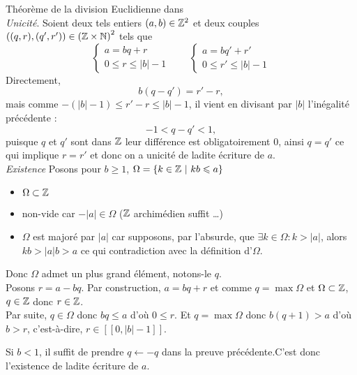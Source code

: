 \documentclass{article}
\begin{document}
  {Théorème de la division Euclidienne dans \Z}
  \hfill\\
  \textit{Unicité}. \;
  Soient deux tels entiers $(a,b) \in \mathbb Z^2$ et deux couples $((q,r),(q',r')) \in \left(\mathbb Z \times \mathbb N\right)^2$ tels que
  \begin{equation*}
    \left\{ \begin{matrix}
      a = b q + r \\
      0 \leqslant r \leqslant |b| - 1
    \end{matrix} \right.
    \qquad
    \left\{ \begin{matrix}
      a = b q' + r' \\
      0 \leqslant r' \leqslant |b| - 1
    \end{matrix} \right.
  \end{equation*}
  Directement,
  \[
    b(q-q') = r'-r,
  \]
  mais comme $-(|b|-1) \leqslant r' - r \leqslant |b| -1$, il vient en divisant par $|b|$ l'inégalité précédente :
  \[
    -1 < q - q' < 1,
  \]
  puisque $q$ et $q'$ sont dans $\mathbb Z$ leur différence est obligatoirement $0$, ainsi $q = q'$ ce qui implique $ r= r'$ et donc on a unicité de ladite écriture de $a$.
  \newline
  \\
  \textit{Existence} \; Posons pour $b \geqslant 1$, $\Omega = \{ k\in \mathbb Z  \ | \ kb \leqslant a \}$
  \begin{itemize}
    \item $\Omega \subset \mathbb Z$
    \item non-vide car $-|a| \in \Omega$ ($\mathbb Z$ archimédien suffit \ldots)
    \item $\Omega$ est majoré par $|a|$ car supposons, par l'absurde, que $\exists k \in \Omega : k > |a|$, alors $kb > |a|b > a$ ce qui contradiction avec la définition d'$\Omega$.
  \end{itemize}
  Donc $\Omega$ admet un plus grand élément, notons-le $q$. \\
  Posons $r = a - bq$. Par construction, $a = bq + r$ et comme $q = \max \Omega$ et $\Omega \subset \mathbb Z$, $q \in \mathbb Z$ donc $r \in \mathbb Z$.
  \\
  Par suite, $q \in \Omega$ donc $bq \leqslant a$ d'où $0 \leqslant r$. Et $q = \max \Omega$ donc $b(q+1) > a$ d'où $b > r$, c'est-à-dire, $r\in [\![ 0, |b| -1 ]\!]$.

  Si $b< 1$, il suffit de prendre $q \leftarrow -q$ dans la preuve précédente.C'est donc l'existence de ladite écriture de $a$.
\end{question_kholle}
\end{document}
